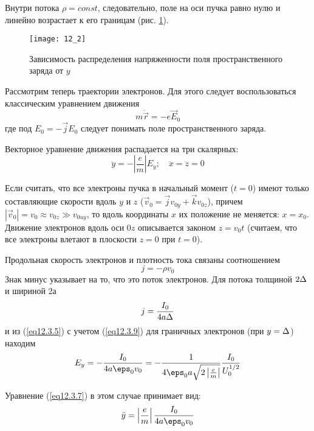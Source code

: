 Внутри потока \( \rho = const \), следовательно, поле на оси пучка равно нулю 
и линейно возрастает к его границам (рис. \ref{img12.2}).

\begin{figure}[h!]
	\center
	\texttt{[image: 12\_2]}
	\caption{Зависимость распределения напряженности поля пространственного
		заряда от \( y \)}
	\label{img12.2}
\end{figure}
 
Рассмотрим теперь траектории электронов. Для этого следует воспользоваться 
классическим уравнением движения
\begin{equation}
	m\ddot{\vec{r}} = -e\vec{E}_0
	\label{eq12.3.6}
\end{equation}
где под \( E_0 = -\vec{j}E_0 \) следует понимать поле пространственного 
заряда. 

Векторное уравнение движения распадается на три скалярных:
\begin{equation}
	\ddot{y} = -\left| \frac{e}{m} \right|E_y; \quad
	\ddot{x} = \ddot{z} = 0
	\label{eq12.3.7}
\end{equation}

Если считать, что все электроны пучка в начальный момент (\( t = 0\)) имеют 
только составляющие  скорости вдоль \( y \) и \( z \) 
(\( \vec{v}_0 = \vec{j}v_{0y} + \vec{k}v_{0z} \)), причем 
\( |\vec{v}_0| = v_0 \approx v_{0z} \gg v_{0uy} \), то вдоль координаты 
\( x \) их положение не меняется: \( x = x_0 \). Движение электронов вдоль оси 
\( 0z \) описывается законом \( z = v_0 t \) (считаем, что все электроны 
влетают в плоскости \( z = 0 \) при \( t = 0 \)).

Продольная скорость электронов и плотность тока связаны соотношением
\begin{equation}
	j = -\rho v_0
	\label{eq12.3.8}
\end{equation}
Знак минус указывает на то, что это поток электронов. Для потока толщиной 
\( 2\Delta \) и шириной \( 2а \)
\begin{equation}
	j = \frac{I_0}{4a\Delta}
	\label{eq12.3.9}
\end{equation}
и из (\ref{eq12.3.5}) с учетом (\ref{eq12.3.9}) для граничных электронов (при 
\( y = \Delta \)) находим
\begin{equation}
	E_y = -\frac{I_0}{4a\eps_0 v_0} = 
		-\frac{1}{4\eps_0 a \sqrt{2\left|\frac{e}{m}\right|}}
		\frac{I_0}{U_0^{1/2}}
	\label{eq12.3.10}
\end{equation}

Уравнение (\ref{eq12.3.7}) в этом случае принимает вид:
\begin{equation}
	\ddot{y} = \left| \frac{e}{m} \right| \frac{I_0}{4a\eps_0 v_0}
	\label{eq12.3.11}
\end{equation}


